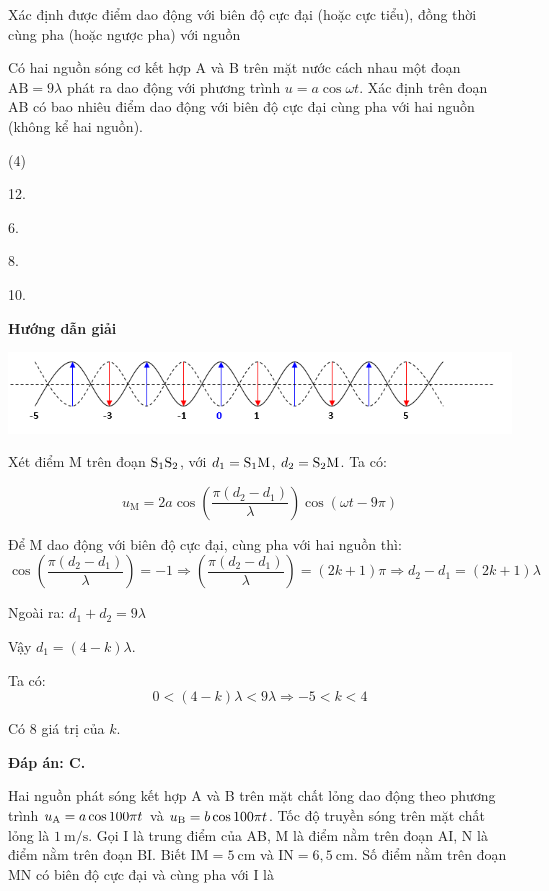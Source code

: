 \begin{dang}{Xác định được điểm dao động với biên độ cực đại (hoặc cực tiểu), đồng thời\\ cùng pha (hoặc ngược pha) với nguồn}
	{Có hai nguồn sóng cơ kết hợp A và B trên mặt nước cách nhau một đoạn $\text{AB} = 9 \lambda$ phát ra dao động với phương trình $u=a \cos \omega t$. Xác định trên đoạn AB có bao nhiêu điểm dao động với biên độ cực đại cùng pha với hai nguồn (không kể hai nguồn).
		
		\begin{mcq}(4)
			\item 12.
			\item 6.
			\item 8.
			\item 10.
		\end{mcq}
	}
	{\begin{center}
			\textbf{Hướng dẫn giải}
			
			\vspace*{1em}
			\includegraphics[scale=0.7]{../figs/VN12-PH-11-A-007-2-V2-2.png}
		\end{center}
		
		Xét điểm M trên đoạn $\text S_1 \text S_2$, với $d_1 = \text S_1 \text M$, $d_2 = \text S_2 \text M$. Ta có:
		
		$$u_\text{M} = 2a \cos \left(\dfrac{\pi (d_2 - d_1)}{\lambda}\right) \cos (\omega t - 9 \pi)$$
		
		Để M dao động với biên độ cực đại, cùng pha với hai nguồn thì:
		$$\cos \left(\dfrac{\pi (d_2 - d_1)}{\lambda}\right) = - 1 \Rightarrow \left(\dfrac{\pi (d_2 - d_1)}{\lambda}\right) = (2k + 1) \pi \Rightarrow d_2 - d_1 = (2k+1) \lambda$$
		
		Ngoài ra: $d_1 + d_2 = 9 \lambda$
		
		Vậy $d_1 = (4-k) \lambda$.
		
		Ta có:
		$$0 < (4-k) \lambda < 9 \lambda \Rightarrow -5 < k < 4$$
		
		Có 8 giá trị của $k$.
		
		\textbf{Đáp án: C.}
	}
	{Hai nguồn phát sóng kết hợp A và B trên mặt chất lỏng dao động theo phương trình $u_\text A = a \cos 100 \pi t$ và $u_\text B = b \cos 100 \pi t$. Tốc độ truyền sóng trên mặt chất lỏng là $1\ \text{m/s}$. Gọi I là trung điểm của AB, M là điểm nằm trên đoạn AI, N là điểm nằm trên đoạn BI. Biết $\text{IM} = 5\ \text{cm}$ và $\text{IN} = 6,5\ \text{cm}$. Số điểm nằm trên đoạn MN có biên độ cực đại và cùng pha với I là
		
}
\end{dang}
